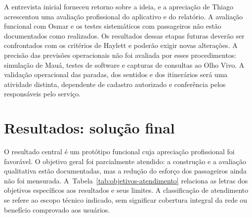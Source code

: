 \documentclass[12pt,oneside,a4paper,brazil,chapter=TITLE]{abntex2}
\begin{document}
A entrevista inicial forneceu retorno sobre a ideia, e a apreciação de Thiago acrescentou uma avaliação profissional do aplicativo e do relatório. A avaliação funcional com Osmar e os testes sistemáticos com passageiros não estão documentados como realizados. Os resultados dessas etapas futuras deverão ser confrontados com os critérios de Haylett e poderão exigir novas alterações. A precisão das previsões operacionais não foi avaliada por esses procedimentos: simulação de Mauá, testes de software e capturas de consultas ao Olho Vivo. A validação operacional das paradas, dos sentidos e dos itinerários será uma atividade distinta, dependente de cadastro autorizado e conferência pelos responsáveis pelo serviço.

\chapter{Resultados: solução final}
O resultado central é um protótipo funcional cuja apreciação profissional foi favorável. O objetivo geral foi parcialmente atendido: a construção e a avaliação qualitativa estão documentadas, mas a redução do esforço dos passageiros ainda não foi mensurada. A~Tabela~\ref{tab:objetivos-atendimento} relaciona as letras dos objetivos específicos aos resultados e seus limites. A classificação de atendimento se refere ao escopo técnico indicado, sem significar cobertura integral da rede ou benefício comprovado aos usuários.
\end{document}
